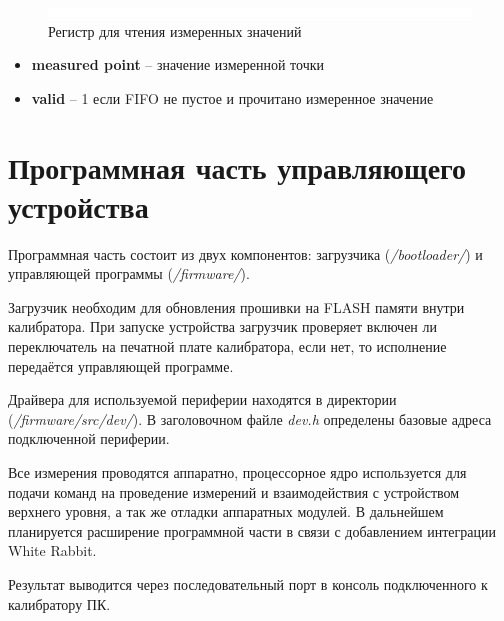 \begin{figure}[ht!] 
	\center
	\includegraphics  {my_folder/images//blank}
	\caption{Регистр для чтения измеренных значений} 
	\label{fig:mu-p-reg}  
\end{figure}
\FloatBarrier
\begin{itemize}[label={}]
	\item \textbf{measured point} -- значение измеренной точки
	\item \textbf{valid} -- 1 если FIFO не пустое и прочитано измеренное значение\\
\end{itemize}

\FloatBarrier

\section{Программная часть управляющего устройства}

Программная часть состоит из двух компонентов: загрузчика (\emph{/bootloader/}) и управляющей программы (\emph{/firmware/}).

Загрузчик необходим для обновления прошивки на FLASH памяти внутри калибратора. При запуске устройства загрузчик проверяет
включен ли переключатель на печатной плате калибратора, если нет, то исполнение передаётся управляющей программе.

Драйвера для используемой периферии находятся в директории (\emph{/firmware/src/dev/}). В заголовочном файле \emph{dev.h}
определены базовые адреса подключенной периферии.

Все измерения проводятся аппаратно, процессорное ядро используется для подачи команд на проведение измерений и
взаимодействия с устройством верхнего уровня, а так же отладки аппаратных модулей.
В дальнейшем планируется расширение программной части в связи с добавлением интеграции
White Rabbit.

Результат выводится через последовательный порт в консоль подключенного к калибратору ПК.

\FloatBarrier

